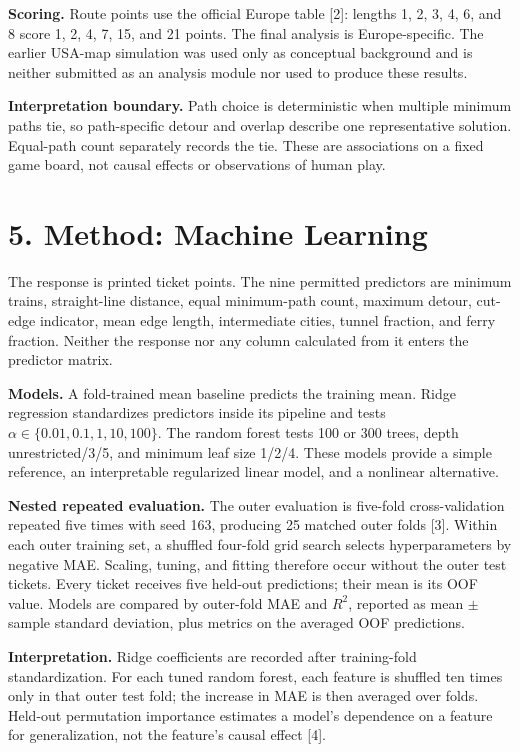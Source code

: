 \documentclass[11pt]{article}
\begin{document}
\textbf{Scoring.} Route points use the official Europe table [2]: lengths 1,
2, 3, 4, 6, and 8 score 1, 2, 4, 7, 15, and 21 points. The final analysis is
Europe-specific. The earlier USA-map simulation was used only as conceptual
background and is neither submitted as an analysis module nor used to
produce these results.

\textbf{Interpretation boundary.} Path choice is deterministic when multiple
minimum paths tie, so path-specific detour and overlap describe one
representative solution. Equal-path count separately records the tie. These
are associations on a fixed game board, not causal effects or observations
of human play.

\newpage
\section*{5. Method: Machine Learning}

The response is printed ticket points. The nine permitted predictors are
minimum trains, straight-line distance, equal minimum-path count, maximum
detour, cut-edge indicator, mean edge length, intermediate cities, tunnel
fraction, and ferry fraction. Neither the response nor any column calculated
from it enters the predictor matrix.

\textbf{Models.} A fold-trained mean baseline predicts the training mean.
Ridge regression standardizes predictors inside its pipeline and
tests $\alpha\in\{0.01,0.1,1,10,100\}$. The random forest tests 100 or 300
trees, depth unrestricted/3/5, and minimum leaf size 1/2/4. These models
provide a simple reference, an interpretable regularized linear model, and a
nonlinear alternative.

\textbf{Nested repeated evaluation.} The outer evaluation is five-fold
cross-validation repeated five times with seed 163, producing 25 matched
outer folds [3]. Within each outer training set, a shuffled four-fold grid
search selects hyperparameters by negative MAE. Scaling, tuning, and fitting
therefore occur without the outer test tickets. Every ticket receives five
held-out predictions; their mean is its OOF value. Models are compared by
outer-fold MAE and $R^2$, reported as mean $\pm$ sample standard deviation,
plus metrics on the averaged OOF predictions.

\textbf{Interpretation.} Ridge coefficients are recorded after training-fold
standardization. For each tuned random forest, each feature is shuffled ten
times only in that outer test fold; the increase in MAE is then averaged over
folds. Held-out permutation importance estimates a model's dependence on a
feature for generalization, not the feature's causal effect [4].
\end{document}
